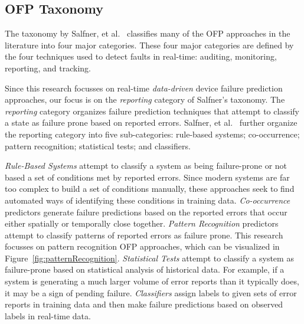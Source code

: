 \subsection{OFP Taxonomy}
The taxonomy by Salfner, et al.~\cite{salfnerSurvey} classifies many of the OFP
approaches in the literature into four major categories.  These four major
categories are defined by the four techniques used to detect faults in
real-time: auditing, monitoring, reporting, and tracking.

Since this research focusses on real-time \emph{data-driven} device failure
prediction approaches, our focus is on the \emph{reporting} category of
Salfner's taxonomy.  The \emph{reporting} category organizes failure prediction
techniques that attempt to classify a state as failure prone based on reported
errors.  Salfner, et al.~\cite{salfnerSurvey} further organize the reporting
category into five sub-categories: rule-based systems; co-occurrence; pattern
recognition; statistical tests; and classifiers.

\emph{Rule-Based Systems} attempt to classify a system as being failure-prone
or not based a set of conditions met by reported errors.  Since modern systems
are far too complex to build a set of conditions manually, these approaches
seek to find automated ways of identifying these conditions in training data.
\emph{Co-occurrence} predictors generate failure predictions based on the
reported errors that occur either spatially or temporally close together.
\emph{Pattern Recognition} predictors attempt to classify patterns of reported
errors as failure prone.  This research focusses on pattern recognition OFP
approaches, which can be visualized in Figure~\ref{fig:patternRecognition}.
\emph{Statistical Tests} attempt to classify a system as failure-prone based on
statistical analysis of historical data.  For example, if a system is
generating a much larger volume of error reports than it typically does, it may
be a sign of pending failure.  \emph{Classifiers} assign labels to given sets
of error reports in training data and then make failure predictions based on
observed labels in real-time data.

\figpatternRecognition
